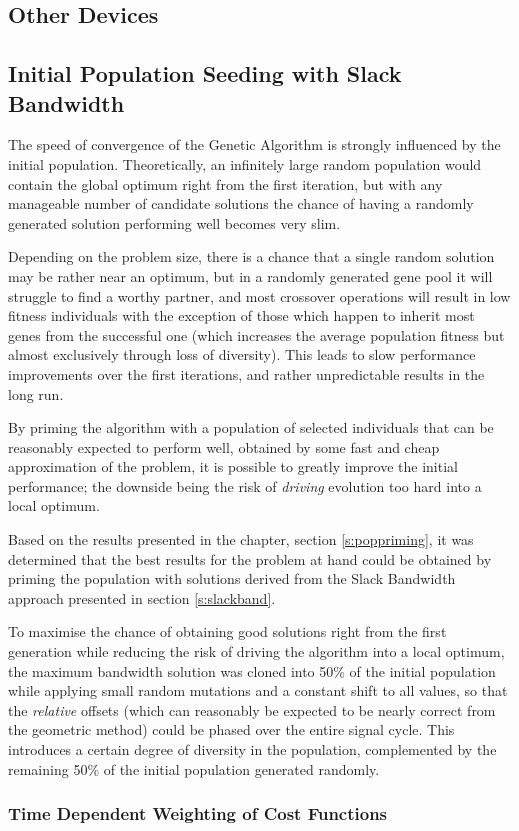 \subsection{Other Devices}

\subsection{Initial Population Seeding with Slack Bandwidth}
The speed of convergence of the Genetic Algorithm is strongly influenced by the initial population.
Theoretically, an infinitely large random population would contain the global optimum right from the first iteration, but with any manageable number of candidate solutions the chance of having a randomly generated solution performing well becomes very slim.

Depending on the problem size, there is a chance that a single random solution may be rather near an optimum, but in a randomly generated gene pool it will struggle to find a worthy partner, and most crossover operations will result in low fitness individuals with the exception of those which happen to inherit most genes from the successful one (which increases the average population fitness but almost exclusively through loss of diversity). This leads to slow performance improvements over the first iterations, and rather unpredictable results in the long run.

By priming the algorithm with a population of selected individuals that can be reasonably expected to perform well, obtained by some fast and cheap approximation of the problem, it is possible to greatly improve the initial performance; the downside being the risk of \emph{driving} evolution too hard into a local optimum.

Based on the results presented in the  chapter, section \ref{s:poppriming}, it was determined that the best results for the problem at hand could be obtained by priming the population with solutions derived from the Slack Bandwidth approach presented in section \ref{s:slackband}.

To maximise the chance of obtaining good solutions right from the first generation while reducing the risk of driving the algorithm into a local optimum, the maximum bandwidth solution was cloned into 50\% of the initial population while applying small random mutations and a constant shift to all values, so that the \emph{relative} offsets (which can reasonably be expected to be nearly correct from the geometric method) could be phased over the entire signal cycle. This introduces a certain degree of diversity in the population, complemented by the remaining 50\% of the initial population generated randomly.

\subsubsection*{Time Dependent Weighting of Cost Functions}








